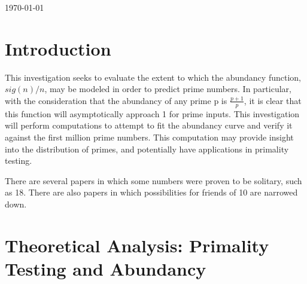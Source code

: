 \documentclass[11pt]{article}
\begin{document}
\begin{titlepage}
{\large \today}\\[3cm] 


 

\vfill 

\end{titlepage}

\tableofcontents
\newpage
\newpage

\section{Introduction}




This investigation seeks to evaluate the extent to which the abundancy function, $sig(n)/n$, may be modeled in order to predict prime numbers. In particular, with the consideration that the abundancy of any prime p is $\frac{p+1}{p}$, it is clear that this function will asymptotically approach 1 for prime inputs. This investigation will perform computations to attempt to fit the abundancy curve and verify it against the first million prime numbers. This computation may provide insight into the distribution of primes, and potentially have applications in primality testing.

There are several papers in which some numbers were proven to be solitary, such as 18. There are also papers in which possibilities for friends of 10 are narrowed down.
$ $ \indent 

\section{Theoretical Analysis: Primality Testing and Abundancy}
\end{document}
